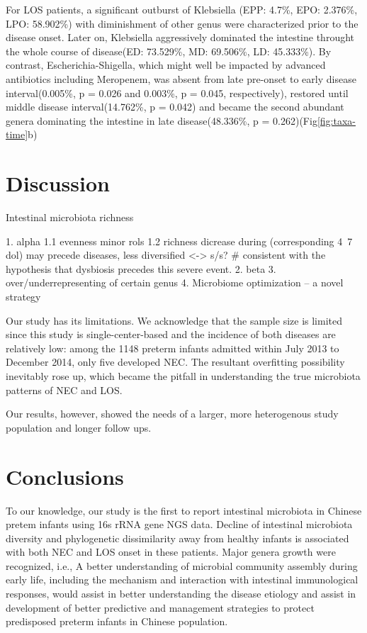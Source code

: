 \documentclass[fleqn,10pt,lineno]{wlpeerj} %
\begin{document}
  \noindent
  For LOS patients, a significant outburst of Klebsiella (EPP: 4.7\%, EPO: 2.376\%, LPO: 58.902\%) with diminishment of other genus were characterized prior to the disease onset. Later on, Klebsiella aggressively dominated the intestine throught the whole course of disease(ED: 73.529\%, MD: 69.506\%, LD: 45.333\%). By contrast, Escherichia-Shigella, which might well be impacted by advanced antibiotics including Meropenem, was absent from late pre-onset to early disease interval(0.005\%, p = 0.026 and 0.003\%, p = 0.045, respectively), restored until middle disease interval(14.762\%, p = 0.042) and became the second abundant genera dominating the intestine in late disease(48.336\%, p = 0.262)(Fig\ref{fig:taxa-time}b)




\section*{Discussion}
Intestinal microbiota richness

1. alpha  1.1 evenness minor rols 1.2 richness dicrease during  (corresponding 4~7 dol) may precede diseases, less diversified <-> s/s? \# consistent with the hypothesis that dysbiosis precedes this severe event.
2. beta
3. over/underrepresenting of certain genus
4. Microbiome optimization -- a novel strategy


\noindent
Our study has its limitations. We acknowledge that the sample size is limited since this study is single-center-based and the incidence of both diseases are relatively low: among the 1148 preterm infants admitted within July 2013 to December 2014, only five developed NEC. The resultant overfitting possibility inevitably rose up, which became the pitfall in understanding the true microbiota patterns of NEC and LOS.

Our results, however, showed the needs of a larger, more heterogenous study population and longer follow ups.

\section*{Conclusions}
To our knowledge, our study is the first to report intestinal microbiota in Chinese pretem infants using 16s rRNA gene NGS data. Decline of intestinal microbiota diversity and phylogenetic dissimilarity away from healthy infants is associated with both NEC and LOS onset in these patients. Major genera growth were recognized, i.e., A better understanding of microbial community assembly during early life, including the mechanism and interaction with intestinal immunological responses, would assist in better understanding the disease etiology and assist in development of better predictive and management strategies to protect predisposed preterm infants in Chinese population.  
\end{document}
